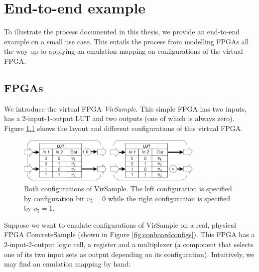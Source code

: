 \chapter{End-to-end example}
To illustrate the process documented in this thesis, we provide an end-to-end example on a small use case. This entails the process from modelling FPGAs all the way up to applying an emulation mapping on configurations of the virtual FPGA.

\section{FPGAs}
We introduce the virtual FPGA \textit{VirSample}. This simple FPGA has two inputs, has a 2-input-1-output LUT and two outputs (one of which is always zero). Figure \ref{fig:virsampleconfigs} shows the layout and different configurations of this virtual FPGA.

\begin{figure}
\centering
\includegraphics[width=0.8\textwidth]{images/endToEnd/exampleFPGA.png}
\caption{Both configurations of VirSample. The left configuration is specified by configuration bit $v_5=0$ while the right configuration is specified by $v_5=1$.}
\label{fig:virsampleconfigs}
\end{figure}

Suppose we want to emulate configurations of VirSample on a real, physical FPGA ConcreteSample (shown in Figure \ref{fig:conboardconfigs}). This FPGA has a 2-input-2-output logic cell, a register and a multiplexer (a component that selects one of its two input sets as output depending on its configuration). Intuitively, we may find an emulation mapping by hand:

